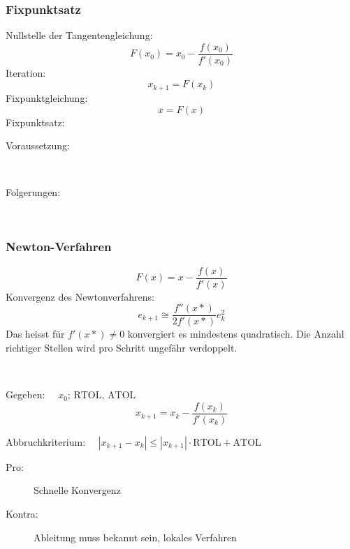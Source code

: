 		\subsubsection{Fixpunktsatz}
			Nullstelle der Tangentengleichung:
			\[
				F(x_0) = x_0 - \frac{f(x_0)}{f'(x_0)}
			\]
			Iteration:
			\[
				x_{k+1} = F(x_k)
			\]
			Fixpunktgleichung:
			\[
				x= F(x)
			\]
			Fixpunktsatz:
			\begin{description}
				\item[Voraussetzung:] ~
				\item[Folgerungen:] ~
			\end{description}

		\subsubsection{Newton-Verfahren}
			\[
				F(x) = x - \frac{f(x)}{f'(x)}
			\]
			Konvergenz des Newtonverfahrens:
			\[
				e_{k+1} \cong \frac{f''(x*)}{2 f'(x*)}e_k^2
			\]
			Das heisst für $f'(x*) \not= 0$ konvergiert es mindestens quadratisch. Die Anzahl richtiger Stellen wird pro Schritt ungefähr verdoppelt.

			\begin{algo} ~

				Gegeben: $\quad x_0;\, \mathrm{RTOL},\, \mathrm{ATOL}$
				\[
					x_{k+1} = x_k - \frac{f(x_k)}{f'(x_k)}
				\]

				Abbruchkriterium: $\quad|x_{k+1} - x_k| \leq |x_{k+1}|\cdot \mathrm{RTOL} + \mathrm{ATOL}$
				\begin{description}
					\item[Pro:] Schnelle Konvergenz
					\item[Kontra:] Ableitung muss bekannt sein, lokales Verfahren
				\end{description}
			\end{algo}

